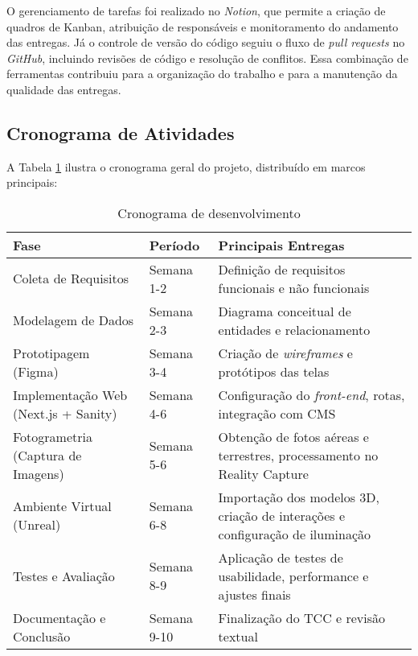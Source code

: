 O gerenciamento de tarefas foi realizado no \textit{Notion}, que permite a criação de quadros de Kanban, atribuição de responsáveis e monitoramento do andamento das entregas. Já o controle de versão do código seguiu o fluxo de \textit{pull requests} no \textit{GitHub}, incluindo revisões de código e resolução de conflitos. Essa combinação de ferramentas contribuiu para a organização do trabalho e para a manutenção da qualidade das entregas.

\subsection{Cronograma de Atividades}
\label{subsec:cronograma_atividades}

A Tabela \ref{tab:cronograma} ilustra o cronograma geral do projeto, distribuído em marcos principais:

\begin{table}[H]
    \centering
    \caption{Cronograma de desenvolvimento}
    \label{tab:cronograma}
    \begin{tabular}{p{4.3cm} p{3.5cm} p{7cm}}
        \hline
        \textbf{Fase} & \textbf{Período} & \textbf{Principais Entregas} \\
        \hline
        Coleta de Requisitos       & Semana 1-2 & Definição de requisitos funcionais e não funcionais \\
        Modelagem de Dados         & Semana 2-3 & Diagrama conceitual de entidades e relacionamento \\
        Prototipagem (Figma)       & Semana 3-4 & Criação de \textit{wireframes} e protótipos das telas \\
        Implementação Web (Next.js + Sanity) & Semana 4-6 & Configuração do \textit{front-end}, rotas, integração com CMS \\
        Fotogrametria (Captura de Imagens) & Semana 5-6 & Obtenção de fotos aéreas e terrestres, processamento no Reality Capture \\
        Ambiente Virtual (Unreal)  & Semana 6-8 & Importação dos modelos 3D, criação de interações e configuração de iluminação \\
        Testes e Avaliação         & Semana 8-9 & Aplicação de testes de usabilidade, performance e ajustes finais \\
        Documentação e Conclusão   & Semana 9-10 & Finalização do TCC e revisão textual \\
        \hline
    \end{tabular}
\end{table}

